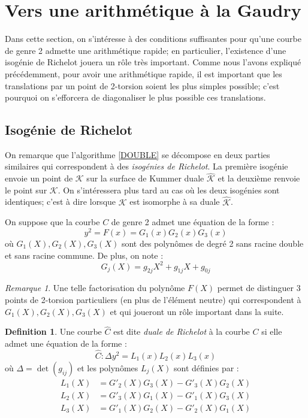 \documentclass[a4paper]{article}
\theoremstyle{definition}
\newtheorem{definition}{Definition}[section]
\theoremstyle{remark}
\newtheorem{remarque}{Remarque}
\numberwithin{equation}{section}
\begin{document}
\section{Vers une arithmétique à la Gaudry}

Dans cette section, on s'intéresse à des conditions suffisantes pour qu'une courbe de genre 2 admette une arithmétique rapide; en particulier, l'existence d'une isogénie de Richelot jouera un rôle très important. Comme nous l'avons expliqué précédemment, pour avoir une arithmétique rapide, il est important que les translations par un point de 2-torsion soient les plus simples possible; c'est pourquoi on s'efforcera de diagonaliser le plus possible ces translations.

\subsection{Isogénie de Richelot}

On remarque que l'algorithme \ref{DOUBLE} se décompose en deux parties similaires qui correspondent à des \emph{isogénies de Richelot}. La première isogénie envoie un point de $\mathcal{K}$ sur la surface de Kummer duale $\hat{\mathcal{K}}$ et la deuxième renvoie le point sur $\mathcal{K}$. On s'intéressera plus tard au cas où les deux isogénies sont identiques; c'est à dire lorsque $\mathcal{K}$ est isomorphe à sa duale $\hat{\mathcal{K}}$.

On suppose que la courbe $C$ de genre 2 admet une équation de la forme :
$$y^2 = F(x) = G_1(x)G_2(x)G_3(x)$$
où $G_1(X),G_2(X),G_3(X)$ sont des polynômes de degré 2 sans racine double et sans racine commune. De plus, on note :
$$G_j(X) = g_{2j}X^2 + g_{1j}X + g_{0j}$$

\begin{remarque}
Une telle factorisation du polynôme $F(X)$ permet de distinguer 3 points de 2-torsion particuliers (en plus de l'élément neutre) qui correspondent à $G_1(X),G_2(X),G_3(X)$ et qui joueront un rôle important dans la suite.
\end{remarque}

\begin{definition}
Une courbe $\hat{C}$ est dite \emph{duale de Richelot} à la courbe $C$ si elle admet une équation de la forme :
$$\hat{C} : \Delta y^2 = L_1(x)L_2(x)L_3(x)$$
où $\Delta = \det(g_{ij})$ et les polynômes $L_j(X)$ sont définies par :
\begin{align*}
L_1(X) &= G'_2(X)G_3(X) - G'_3(X)G_2(X) \\
L_2(X) &= G'_3(X)G_1(X) - G'_1(X)G_3(X) \\
L_3(X) &= G'_1(X)G_2(X) - G'_2(X)G_1(X)
\end{align*}
\end{definition}
\end{document}
